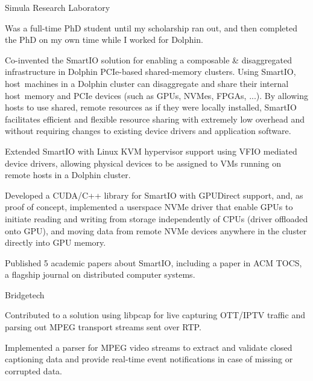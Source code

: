 \begin{experience}{Simula Research Laboratory}{
}
    \item{Was a full-time PhD student until my scholarship ran out, and then completed the PhD on my own time while I worked for Dolphin.}
    \item{Co-invented the SmartIO solution for enabling a composable \& disaggregated infrastructure in Dolphin PCIe-based shared-memory clusters. Using SmartIO, host~machines in a Dolphin cluster can disaggregate and share their internal host~memory and PCIe devices (such as GPUs, NVMes, FPGAs, ...). By allowing hosts to use shared, remote resources as if they were locally installed, SmartIO facilitates efficient and flexible resource sharing with extremely low overhead and without requiring changes to existing device drivers and application software.}
    \item{Extended SmartIO with Linux KVM hypervisor support using VFIO mediated device drivers, allowing physical devices to be assigned to VMs running on remote hosts in a Dolphin cluster.}
    \item{Developed a CUDA/C++ library for SmartIO with GPUDirect support, and, as proof of concept, implemented a userspace NVMe driver that enable GPUs to initiate reading and writing from storage independently of CPUs (driver offloaded onto GPU), and moving data from remote NVMe devices anywhere in the cluster directly into GPU memory.}
    \item{Published 5 academic papers about SmartIO, including a paper in ACM TOCS, a flagship journal on distributed computer systems.}
\end{experience}

\begin{experience}{Bridgetech}{}
    \item{Contributed to a solution using libpcap for live capturing OTT/IPTV traffic and parsing out MPEG transport streams sent over RTP.}
    \item{Implemented a parser for MPEG video streams to extract and validate closed captioning data and provide real-time event notifications in case of missing or corrupted data.}
\end{experience}




